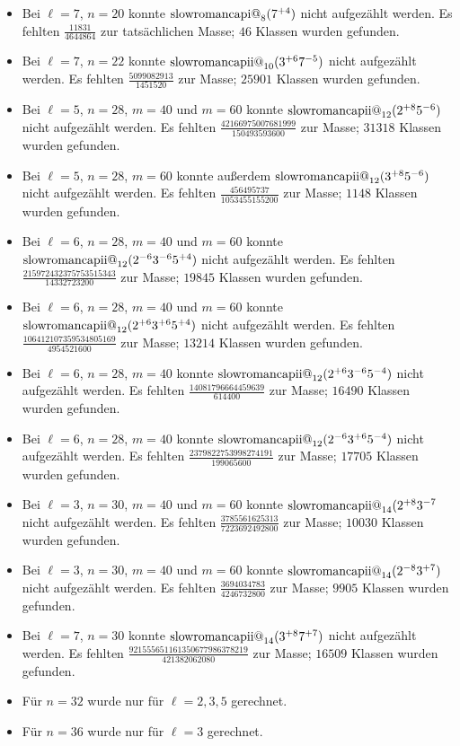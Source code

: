 \documentclass[12pt,a4paper,halfparskip,headsepline,bibtotocnumbered]{scrreprt}
\makeatletter
\theoremstyle{nummermitklammern}
\theoremstyle{nonumberbreak}
\renewcommand{\i}{\text{\expandafter\@slowromancap\romannumeral 1@}}
\newcommand{\ii}{\text{\expandafter\@slowromancap\romannumeral 2@}}
\makeatother
\begin{document}
\begin{itemize}
	\item Bei $\ell = 7$, $n = 20$ konnte $\i_8(7^{+4})$ nicht aufgezählt werden. Es fehlten $\frac{11831}{4644864}$ zur tatsächlichen Masse; $46$ Klassen wurden gefunden.
	\item Bei $\ell = 7$, $n = 22$ konnte $\ii_{10}(3^{+6}7^{-5})$ nicht aufgezählt werden. Es fehlten $\frac{5099082913}{1451520}$ zur Masse; $25901$ Klassen wurden gefunden.
	\item Bei $\ell = 5$, $n=28$, $m = 40$ und $m = 60$ konnte $\ii_{12}(2^{+8}5^{-6})$ nicht aufgezählt werden. Es fehlten $\frac{42166975007681999}{150493593600}$ zur Masse; $31318$ Klassen wurden gefunden.
	\item Bei $\ell = 5$, $n = 28$, $m = 60$ konnte außerdem $\ii_{12}(3^{+8}5^{-6})$ nicht aufgezählt werden. Es fehlten $\frac{456495737}{1053455155200}$ zur Masse; $1148$ Klassen wurden gefunden.
	\item Bei $\ell = 6$, $n = 28$, $m = 40$ und $m = 60$ konnte $\ii_{12}(2^{-6}3^{-6}5^{+4})$ nicht aufgezählt werden. Es fehlten $\frac{215972432375753515343}{14332723200}$ zur Masse; $19845$ Klassen wurden gefunden.
	\item Bei $\ell = 6$, $n = 28$, $m = 40$ und $m = 60$ konnte $\ii_{12}(2^{+6} 3^{+6} 5^{+4})$ nicht aufgezählt werden. Es fehlten $\frac{106412107359534805169}{4954521600}$ zur Masse; $13214$ Klassen wurden gefunden.
	\item Bei $\ell = 6$, $n = 28$, $m = 40$ konnte $\ii_{12}(2^{+6}3^{-6}5^{-4})$ nicht aufgezählt werden. Es fehlten $\frac{14081796664459639}{614400}$ zur Masse; $16490$ Klassen wurden gefunden.
	\item Bei $\ell = 6$, $n = 28$, $m = 40$ konnte $\ii_{12}(2^{-6}3^{+6}5^{-4})$ nicht aufgezählt werden. Es fehlten $\frac{2379822753998274191}{199065600}$ zur Masse; $17705$ Klassen wurden gefunden.
	\item Bei $\ell = 3$, $n = 30$, $m = 40$ und $m=60$ konnte $\ii_{14}(2^{+8}3^{-7}$ nicht aufgezählt werden. Es fehlten $\frac{3785561625313}{7223692492800}$ zur Masse; $10030$ Klassen wurden gefunden.
	\item Bei $\ell = 3$, $n = 30$, $m = 40$ und $m=60$ konnte $\ii_{14}(2^{-8}3^{+7})$ nicht aufgezählt werden. Es fehlten $\frac{3694034783}{4246732800}$ zur Masse; $9905$ Klassen wurden gefunden.
	\item Bei $\ell = 7$, $n = 30$ konnte $\ii_{14}(3^{+8}7^{+7})$ nicht aufgezählt werden. Es fehlten $\frac{921555651161350677986378219}{421382062080}$ zur Masse; $16509$ Klassen wurden gefunden.
	\item Für $n = 32$ wurde nur für $\ell = 2,3,5$ gerechnet.
	\item Für $n = 36$ wurde nur für $\ell = 3$ gerechnet.
\end{itemize}
\end{document}
